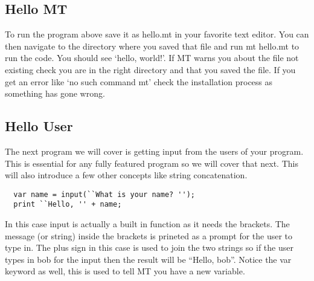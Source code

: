 \documentclass{report}
\begin{document}
\subsection{Hello MT}
To run the program above save it as hello.mt in your favorite text editor. You can then navigate to the directory where you saved that file and run mt hello.mt to run the code. You should see `hello, world!'. If MT warns you about the file not existing check you are in the right directory and that you saved the file. If you get an error like `no such command mt' check the installation process as something has gone wrong.

\subsection{Hello User}
The next program we will cover is getting input from the users of your program. This is essential for any fully featured program so we will cover that next. This will also introduce a few other concepts like string concatenation.

\begin{lstlisting}
  var name = input(``What is your name? '');
  print ``Hello, '' + name;
\end{lstlisting}

In this case input is actually a built in function as it needs the brackets. The message (or string) inside the brackets is prineted as a prompt for the user to type in. The plus sign in this case is used to join the two strings so if the user types in bob for the input then the result will be ``Hello, bob''. Notice the var keyword as well, this is used to tell MT you have a new variable.
\end{document}
